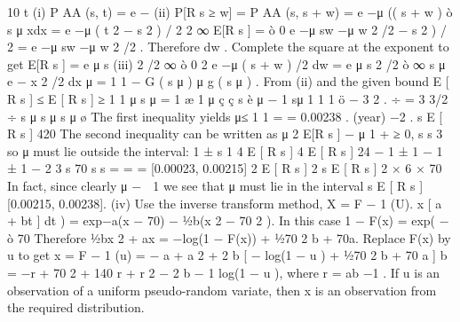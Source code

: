 \documentclass[a4paper,12pt]{article}
\begin{document}
10
t
(i) P AA (s, t) = e −
(ii) P[R s ≥ w] = P AA (s, s + w) = e −μ (( s + w )
ò s
μ xdx
= e −μ ( t
2
− s 2 ) / 2
2
∞
E[R s ] =
ò 0
e −μ sw −μ w
2
/2
− s 2 ) / 2
= e −μ sw −μ w
2
/2
. Therefore
dw .
Complete the square at the exponent to get
E[R s ] = e μ s
(iii)
2
/2
∞
ò 0
2
e −μ ( s + w )
/2
dw = e μ s
2
/2
ò
∞
s μ
e − x
2
/2
dx
μ
=
1 1 − G ( s μ )
μ
g ( s μ )
.
From (ii) and the given bound
E [ R s ] ≤
E [ R s ] ≥
1
1
μ s μ
=
1 æ 1
μ
ç
ç s
è
μ
−
1
sμ
1
1
1 ö
− 3 2 .
÷ =
3 3/2 ÷
s μ s μ
s μ ø
The first inequality yields
μ≤
1
1
=
= 0.00238 . (year) −2 .
s E [ R s ]
420
The second inequality can be written as
μ 2 E[R s ] −
μ 1
+
≥ 0,
s s 3
so μ must lie outside the interval:
1
±
s
1 4 E [ R s ]
4 E [ R s ]
24
−
1 ± 1 −
1 ± 1 −
2
3
s
70
s
s
=
=
= [0.00023, 0.00215]
2 E [ R s ]
2 s E [ R s ]
2 × 6 × 70
In fact, since clearly μ − 
1
we see that μ must lie in the interval
s E [ R s ]
[0.00215, 0.00238].
(iv)
Use the inverse transform method, X = F − 1 (U).
x
[ a + bt ] dt ) = exp{−a(x − 70) − 1⁄2b(x 2 − 70 2 )}.
In this case 1 − F(x) = exp( − ò 70
Therefore 1⁄2bx 2 + ax = −log(1 − F(x)) + 1⁄270 2 b + 70a. Replace F(x) by u to
get
x = F − 1 (u) =
− a + a 2 + 2 b [ − log(1 − u ) + 1⁄270 2 b + 70 a ]
b
= −r + 70 2 + 140 r + r 2 − 2 b − 1 log(1 − u ),
where r = ab −1 . If u is an observation of a uniform pseudo-random variate,
then x is an observation from the required distribution.
\end{document}
